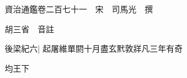 






























































資治通鑑卷二百七十一　宋　司馬光　撰

胡三省　音註

後梁紀六|{
	起屠維單閼十月盡玄黓敦牂凡三年有奇}


均王下


